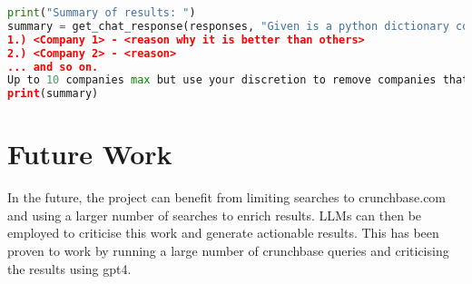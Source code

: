 \documentclass[a4paper,11pt]{article}
\begin{document}
\begin{lstlisting}[language=Python, caption=Generating Summary of data]
print("Summary of results: ")
summary = get_chat_response(responses, "Given is a python dictionary containing information about various startup companies. You are an experienced venture capitalist who has invested in many successful startups and know very well what distinguishes a successful, unicorn startup from its mediocre counterpart at an early stage. Examine the company details one by one and evaluate how successful you think the company can be. As a venture capitalist, you prioritise smaller companies with innovative ideas with well-educated founders that are visionaries in their field. Assign a numerical ranking to the companies according to your evaluation and return this ranked list with an up to 10 word description of why you think the company deserves this rank. Format: 
1.) <Company 1> - <reason why it is better than others> 
2.) <Company 2> - <reason> 
... and so on.
Up to 10 companies max but use your discretion to remove companies that you feel do not deserve to be on the list. The dictionary is below: ", model="gpt-4-turbo-preview")
print(summary)
\end{lstlisting}

\section{Future Work} 
In the future, the project can benefit from limiting searches to crunchbase.com and using a larger number of searches to enrich results. LLMs can then be employed to criticise this work and generate actionable results. This has been proven to work by running a large number of crunchbase queries and criticising the results using gpt4.
\end{document}
